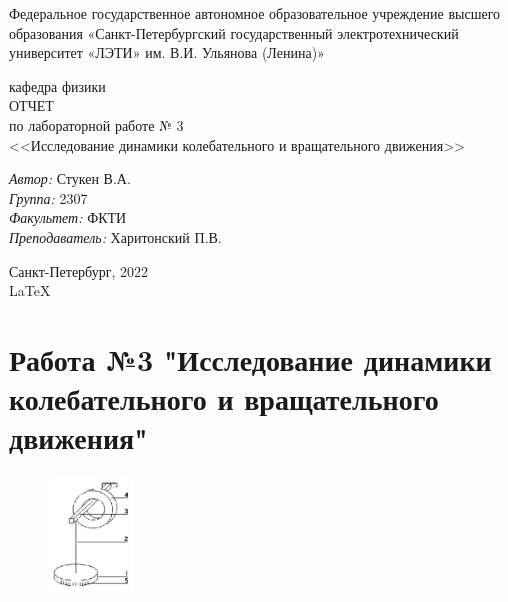 \documentclass[a4paper,12pt]{report}
\begin{document}
 

\begin{titlepage} 

\begin{center} 

\large Федеральное государственное автономное образовательное учреждение высшего образования «Санкт-Петербургский государственный электротехнический университет «ЛЭТИ» им. В.И. Ульянова (Ленина)»
	
кафедра физики\\[5cm] 


\huge ОТЧЕТ\\ по лабораторной работе № 3\\[0.5cm] 
\large <<Исследование динамики колебательного и вращательного движения>>\\[3.7cm]

\begin{minipage}{1\textwidth} 
    \begin{flushleft} 
        \emph{Автор:} Стукен В.А.\\
        \emph{Группа:} 2307\\
        \emph{Факультет:} ФКТИ\\
        \emph{Преподаватель:} Харитонский П.В. 
    \end{flushleft} 
\end{minipage} 

\vfill 

Санкт-Петербург, 2022\\
{\large \LaTeX} 

\end{center} 

\thispagestyle{empty} 
\end{titlepage} 

\section*{Работа №3 "Исследование динамики колебательного и вращательного движения"}

\begin{figure}
    \includegraphics[width=0.2\textwidth]{ustanovka.jpg}
    \label{ris:image}
\end{figure}
\end{document}
